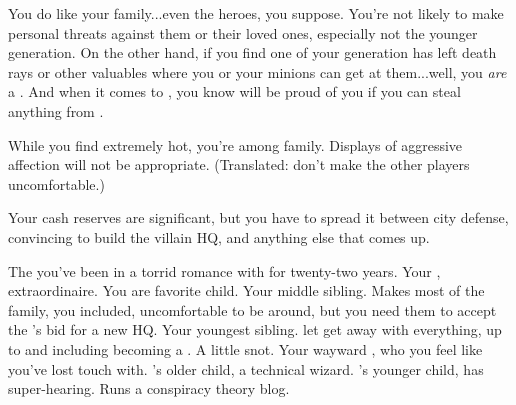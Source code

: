 \documentclass[char]{LRSguildcamp1}
\begin{document}
\begin{itemz}[Notes]
	\item You do like your family...even the heroes, you suppose.  You're not likely to make personal threats against them or their loved ones, especially not the younger generation.  On the other hand, if you find one of your generation has left death rays or other valuables where you or your minions can get at them...well, you \emph{are} a \cOldest{\villain}.  And when it comes to \cGrandma{\Parent}, you know \cGrandma{\they} will be proud of you if you can steal anything from \cGrandma{\them}.
	\item While you find \cOS{} extremely hot, you're among family.  Displays of aggressive affection will not be appropriate.  (Translated: don't make the other players uncomfortable.)
	\item Your cash reserves are significant, but you have to spread it between city defense, convincing \cArchitect{} to build the villain HQ, and anything else that comes up.
\end{itemz}

\begin{contacts}
	\contact{\cOS{}} The \cOS{\hero} you've been in a torrid romance with for twenty-two years.
	\contact{\cGrandma{}} Your \cGrandma{\parent}, \cGrandma{\villain} extraordinaire.  You are \cGrandma{\their} favorite child.
	\contact{\cArchitect{}} Your middle sibling.  Makes most of the family, you included, uncomfortable to be around, but you need them to accept the \cVillainCompact{\intro}'s bid for a new HQ.
	\contact{\cYoungest{}} Your youngest sibling.  \cGrandma{\Parent} let \cYoungest{\them} get away with everything, up to and including becoming a \cYoungest{\hero}.  A little snot.
	\contact{\cGrad{}} Your wayward \cGrad{\offspring}, who you feel like you've lost touch with.
	\contact{\cTeen{}} \cArchitect{}'s older child, a technical wizard.
	\contact{\cTween{}} \cArchitect{}'s younger child, has super-hearing.  Runs a conspiracy theory blog.  
\end{contacts}
\end{document}
